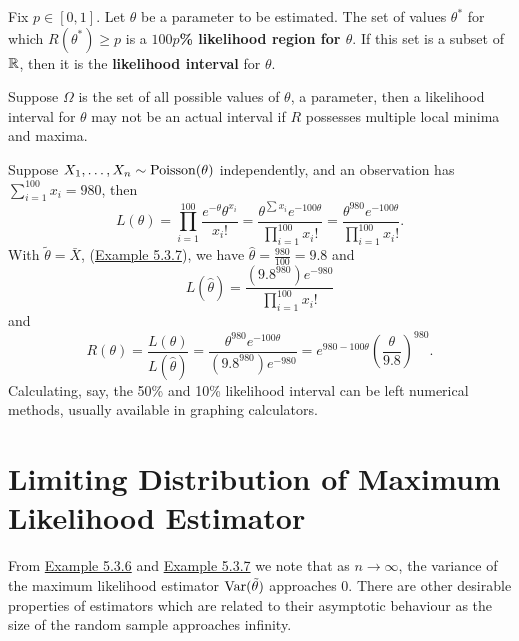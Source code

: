 \documentclass[11pt,fleqn]{book} %
\begin{document}
\begin{definition} \label{def:553}
Fix \(p \in [0, 1]\). Let \(\theta\) be a parameter to be estimated. The set of values \(\theta^*\) for which \(R(\theta^*) \geq p\) is a \textbf{\(100p\)\% likelihood region for \(\theta\)}. If this set is a subset of \(\mathbb{R}\), then it is the \textbf{likelihood interval} for \(\theta\).
\end{definition}

\begin{remark} \label{rmk:554}
Suppose \(\Omega\) is the set of all possible values of \(\theta\), a parameter, then a likelihood interval for \(\theta\) may not be an actual interval if \(R\) possesses multiple local minima and maxima.
\end{remark}

\begin{example} \label{eg:555}
Suppose \(X_1, \ldots, X_n \sim \operatorname{Poisson}(\theta)\) independently, and an observation has \(\sum_{i=1}^{100}x_i = 980\), then
\[
L(\theta) = \prod_{i=1}^{100}\frac{e^{-\theta}\theta^{x_i}}{x_i!} = \frac{\theta^{\sum x_i}e^{-100\theta}}{\prod_{i=1}^{100}x_i!} = \frac{\theta^{980}e^{-100\theta}}{\prod_{i=1}^{100}x_i!}.
\]
\indent With \(\tilde{\theta} = \bar{X}\), (\hyperref[eg:537]{Example 5.3.7}), we have \(\hat{\theta} = \frac{980}{100} = 9.8\) and
\[
L(\hat{\theta}) = \frac{(9.8^{980})e^{-980}}{\prod_{i=1}^{100}x_i!}
\]
and
\[
R(\theta) = \frac{L(\theta)}{L(\hat{\theta})} = \frac{\theta^{980}e^{-100\theta}}{(9.8^{980})e^{-980}} = e^{980 - 100\theta}\left(\frac{\theta}{9.8}\right)^{980}.
\]
\indent Calculating, say, the 50\% and 10\% likelihood interval can be left numerical methods, usually available in graphing calculators.
\end{example}


\section{Limiting Distribution of Maximum Likelihood Estimator}

\begin{remark} From \hyperref[eg:536]{Example 5.3.6} and \hyperref[eg:537]{Example 5.3.7} we note that as \(n\rightarrow\infty\), the variance of the maximum likelihood estimator \(\operatorname{Var}(\tilde{\theta})\) approaches 0. There are other desirable properties of estimators which are related to their asymptotic behaviour as the size of the random sample approaches infinity.
\end{remark}
\end{document}
